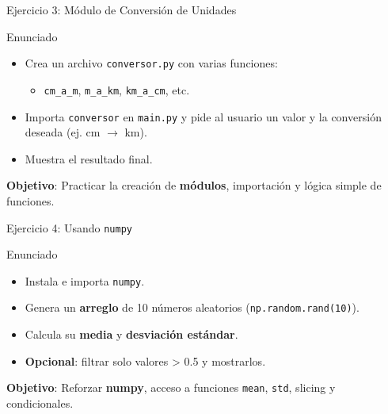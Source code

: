 \documentclass[10pt]{beamer}
\begin{document}
\begin{frame}{Ejercicio 3: Módulo de Conversión de Unidades}
  \begin{block}{Enunciado}
    \begin{itemize}
      \item Crea un archivo \texttt{conversor.py} con varias funciones:
        \begin{itemize}
          \item \texttt{cm\_a\_m}, \texttt{m\_a\_km}, \texttt{km\_a\_cm}, etc.
        \end{itemize}
      \item Importa \texttt{conversor} en \texttt{main.py} y pide al usuario un valor y la conversión deseada (ej. cm \(\rightarrow\) km).
      \item Muestra el resultado final.
    \end{itemize}
  \end{block}
  \textbf{Objetivo}: Practicar la creación de \textbf{módulos}, importación y lógica simple de funciones.
\end{frame}

\begin{frame}{Ejercicio 4: Usando \texttt{numpy}}
  \begin{block}{Enunciado}
    \begin{itemize}
      \item Instala e importa \texttt{numpy}.
      \item Genera un \textbf{arreglo} de 10 números aleatorios (\texttt{np.random.rand(10)}).
      \item Calcula su \textbf{media} y \textbf{desviación estándar}.
      \item \textbf{Opcional}: filtrar solo valores > 0.5 y mostrarlos.
    \end{itemize}
  \end{block}
  \textbf{Objetivo}: Reforzar \textbf{numpy}, acceso a funciones \texttt{mean}, \texttt{std}, slicing y condicionales.
\end{frame}
\end{document}
